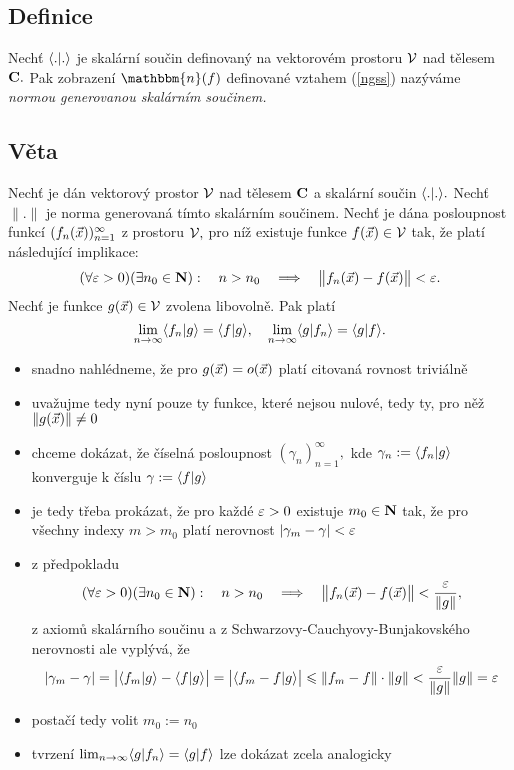 \subsection{Definice}\label{jiste}

Nech\v t $\langle . | . \rangle$ je skal\'arn\'i sou\v cin definovan\'y na
vektorov\'em prostoru ${\mathcal V}$ nad t\v elesem ${\mathbf C}.$ Pak zobrazen\'i
$\mathbbm{n}(f)$ definovan\'e vztahem (\ref{ngss}) naz\'yv\'ame
\emph{normou generovanou skal\'arn\'im sou\v cinem.}


\subsection{V\v eta}\label{love_so_beautiful}

Nech\v t je d\'an vektorov\'y prostor ${\mathcal V}$ nad t\v elesem ${\mathbf C}$ a
skal\'arn\'i sou\v cin $\langle . | . \rangle.$ Nech\v t $\|.\|$ je norma
generovan\'a t\'imto skal\'arn\'im sou\v cinem. Nech\v t je d\'ana posloupnost funkc\'i $(f_n({\vec{x}}))_{n=1}^\infty$ z prostoru ${\mathcal V},$ pro n\'i\v z existuje funkce $f({\vec{x}})\in{\mathcal V}$ tak, \v ze plat\'i n\'asleduj\'ic\'i implikace:
%
$$(\forall \varepsilon>0)(\exists n_0\in{\mathbf N}): \quad n>n_0 \quad \Longrightarrow  \quad \bigl\|f_n({\vec{x}})-f({\vec{x}})\bigr\|<\varepsilon.$$
%
Nech\v t je funkce $g({\vec{x}})\in{\mathcal V}$ zvolena libovoln\v e. Pak plat\'i
%
$$\lim_{n \rightarrow \infty} \langle f_n|g \rangle = \langle f|g \rangle, \quad \lim_{n \rightarrow \infty} \langle g|f_n \rangle = \langle g|f \rangle.$$

\Proof

\begin{itemize}
\item snadno nahl\'edneme, \v ze pro $g({\vec{x}})=o({\vec{x}})$ plat\'i citovan\'a rovnost trivi\'aln\v e
\item uva\v zujme tedy nyn\'i pouze ty funkce, kter\'e nejsou nulov\'e, tedy ty, pro n\v e\v z $\|g({\vec{x}})\|\neq 0$
\item chceme dok\'azat, \v ze \v c\'iseln\'a posloupnost $(\gamma_n)_{n=1}^\infty,$ kde $\gamma_n:= \langle f_n|g \rangle$ konverguje k \v c\'islu $\gamma:= \langle f|g \rangle$
\item je tedy t\v reba prok\'azat, \v ze pro ka\v zd\'e $\varepsilon>0$ existuje $m_0\in{\mathbf N}$ tak, \v ze pro v\v sechny indexy $m>m_0$ plat\'i nerovnost $|\gamma_m-\gamma|<\varepsilon$
\item z p\v redpokladu
%
$$(\forall \varepsilon>0)(\exists n_0\in{\mathbf N}): \quad n>n_0 \quad \Longrightarrow  \quad \bigl\|f_n({\vec{x}})-f({\vec{x}})\bigr\|<\frac{\varepsilon}{\|g\|},$$
%
z axiom\r u skal\'arn\'iho sou\v cinu a z Schwarzovy-Cauchyovy-Bunjakovsk\'eho nerovnosti ale vypl\'yv\'a, \v ze
%
$$ |\gamma_m-\gamma| = \bigl|\langle f_m|g \rangle-\langle f|g \rangle\bigr| = \bigl|\langle f_m-f|g  \rangle\bigr| \leqslant \|f_m-f\|\cdot \|g\| < \frac{\varepsilon}{\|g\|}\|g\| =\varepsilon$$
\item posta\v c\'i tedy volit $m_0:=n_0$
\item tvrzen\'i $\lim_{n \rightarrow \infty} \langle g|f_n \rangle = \langle g|f \rangle$ lze dok\'azat zcela analogicky
\end{itemize}




